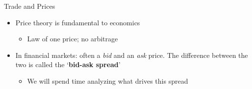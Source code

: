 \documentclass[english,10pt
,aspectratio=169
]{beamer}
\begin{document}
\begin{frame}{Trade and Prices}
\begin{itemize}
	\item Price theory is fundamental to economics
	\begin{itemize}
		\item Law of one price; no arbitrage
	\end{itemize}
	\item In financial markets: often a \textit{bid} and an \textit{ask} price. The difference between the two is called the `\textbf{bid-ask spread}'
	\begin{itemize}
		\item We will spend time analyzing what drives this spread
	\end{itemize}
\end{itemize}
\end{frame}
\end{document}
